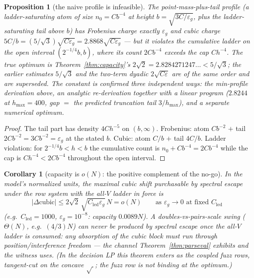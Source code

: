 \documentclass[11pt]{article}
\theoremstyle{plain}
\newtheorem{proposition}[theorem]{Proposition}
\newtheorem{corollary}[theorem]{Corollary}
\theoremstyle{definition}
\theoremstyle{remark}
\newcommand{\Cled}{C_{\mathrm{led}}}
\begin{document}
\begin{proposition}[the naive profile is infeasible]
\label{prop:naive}
The point-mass-plus-tail profile (a ladder-saturating atom of size
$n_0 = C b^{-4}$ at height $b = \sqrt{3C/\varepsilon_g}$, plus the
ladder-saturating tail above $b$) has Frobenius charge exactly $\varepsilon_g$
and cubic charge
$5C/b = (5/\sqrt{3})\sqrt{C \varepsilon_g} = 2.8868\sqrt{C \varepsilon_g}$ ---
but it violates the cumulative ladder on the open interval $(2^{-1/4} b, b)$,
where its count $2 C b^{-4}$ exceeds the cap $C h^{-4}$. The true optimum is
Theorem~\ref{thm:capacity}'s $2\sqrt{2} = 2.8284271247\ldots < 5/\sqrt{3}$; the
earlier estimates $5/\sqrt{3}$ and the two-term dyadic $2\sqrt{C\varepsilon}$ are
of the same order and are superseded. The constant is confirmed three independent
ways: the min-profile derivation above, an analytic re-derivation together with
a linear program ($2.8244$ at $h_{\max} = 400$, gap $=$ the predicted truncation
tail $3/h_{\max}$), and a separate numerical optimum.
\end{proposition}

\begin{proof}
The tail part has density $4 C h^{-5}$ on $(b, \infty)$. Frobenius: atom
$C b^{-2}$ $+$ tail $2 C b^{-2} = 3 C b^{-2} = \varepsilon_g$ at the stated $b$.
Cubic: atom $C/b$ $+$ tail $4C/b$. Ladder violation: for
$2^{-1/4} b < h < b$ the cumulative count is $n_0 + C b^{-4} = 2 C b^{-4}$ while
the cap is $C h^{-4} < 2 C b^{-4}$ throughout the open interval.
\end{proof}

\begin{corollary}[capacity is $o(N)$: the positive complement of the no-go]
\label{cor:oN}
In the model's normalized units, the maximal cubic shift purchasable by
spectral escape under
the row system with the all-$V$ ladder in force is
\[
  |\Delta \text{cubic}| \le 2\sqrt{2}\,\sqrt{\Cled \varepsilon_g}\, N = o(N)
  \qquad \text{as } \varepsilon_g \to 0 \text{ at fixed } \Cled
\]
(e.g.\ $\Cled = 1000$, $\varepsilon_g = 10^{-8}$: capacity $0.0089 N$). A
doubles-vs-pairs-scale swing ($\Theta(N)$, e.g.\ $(4/3)N$) can never be produced
by spectral escape once the all-$V$ ladder is consumed: any absorption of the
cubic block must run through position/interference freedom --- the channel
Theorem~\ref{thm:parseval} exhibits and the witness uses. (In the decision LP this
theorem enters as the coupled fuzz rows, tangent-cut on the concave $\sqrt{\ }$;
the fuzz row is not binding at the optimum.)
\end{corollary}
\end{document}
